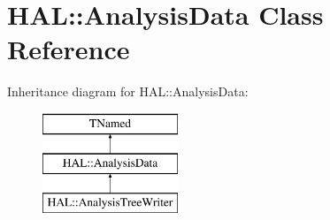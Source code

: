 \hypertarget{class_h_a_l_1_1_analysis_data}{\section{H\+A\+L\+:\+:Analysis\+Data Class Reference}
\label{class_h_a_l_1_1_analysis_data}
}
Inheritance diagram for H\+A\+L\+:\+:Analysis\+Data\+:\begin{figure}[H]
\begin{center}
\leavevmode
\includegraphics[height=3.000000cm]{class_h_a_l_1_1_analysis_data}
\end{center}
\end{figure}
